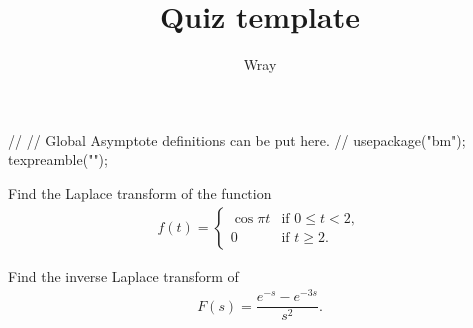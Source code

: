 \documentclass[addpoints, 12pt]{exam}
\title{Quiz template}
\author{Wray}
\begin{document}
\begin{asydef}
//
// Global Asymptote definitions can be put here.
//
usepackage("bm");
texpreamble("\def\V#1{\bm{#1}}");
\end{asydef}



\bigskip

             
\bigskip
\bigskip

\smallskip

\begin{questions}

\question[10]
Find the Laplace transform of the function
\begin{align*} f(t) =
	\begin{cases}
		\cos \pi t & \mbox{if } 0 \le t <2, \\
        0 & \mbox{if } t \ge 2.
	\end{cases}
\end{align*}

\clearpage

\question[10]
Find the inverse Laplace transform of 
\begin{align*}
	F(s) = \dfrac{e^{-s} - e^{-3s}}{s^2}.
\end{align*}

\end{questions}
\end{document}
